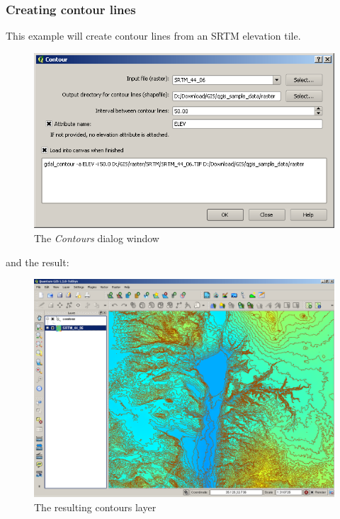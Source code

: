 \subsubsection{Creating contour lines}
This example will create contour lines from an SRTM elevation tile.
\begin{figure}[ht]
   \centering
   \caption{\label{gdal_contour} The \emph{Contours} dialog window \nixcaption}
   \includegraphics[clip=true, width=12cm]{plugins_gdaltools_images/gdal_contour}
\end{figure}
and the result:
\begin{figure}[ht]
   \centering
   \caption{\label{gdal_contour} The resulting contours layer \nixcaption}
   \includegraphics[clip=true, width=12cm]{plugins_gdaltools_images/qgis_contours}
\end{figure}

